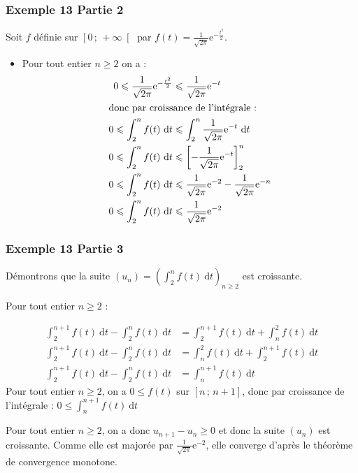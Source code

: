 \documentclass[11pt, hyperref={urlcolor=red,%
            linkcolor=blue, %
            colorlinks=true}]{beamer}
\newcommand{\Interfo}[2]{\left[#1\, ;\, #2\right[}
\newcommand{\Interff}[2]{\left[#1\, ;\, #2\right]}
\newcommand{\suite}[1]{\ensuremath{\left(#1_{n}\right)}}
\newcommand{\Suite}[2]{\ensuremath{\left(#1\right)_{#2}}}
\newcommand{\dt}{\ensuremath{\text{d}t}}		%
\newcommand{\integralet}[3]{\int_{#1}^{#2} #3 \ \dt}
\begin{document}
\begin{frame}
\frametitle{Exemple  13 Partie 2}

Soit $f$ définie sur $\Interfo{0}{+\infty}$ par $f(t)=\frac{1}{\sqrt{2\pi}}\text{e}^{-\frac{t^2}{2}}$.

\pause \begin{itemize}
\item  Pour tout entier $n \geqslant 2$ on a : 
\pause \begin{align*}
0 \leqslant  \frac{1}{\sqrt{2\pi}}\text{e}^{-\frac{t^2}{2}}   &\leqslant  \frac{1}{\sqrt{2\pi}}\text{e}^{-t} \\
\intertext{donc par croissance de l'intégrale :}
0 \leqslant \integralet{2}{n}{f(t)} & \leqslant \integralet{2}{n}{\frac{1}{\sqrt{2\pi}}\text{e}^{-t} } \\
0 \leqslant \integralet{2}{n}{f(t)} & \leqslant \left[-\frac{1}{\sqrt{2\pi}}\text{e}^{-t}  \right]_{2}^{n} \\ 
0 \leqslant \integralet{2}{n}{f(t)} & \leqslant \frac{1}{\sqrt{2\pi}}\text{e}^{-2}-  \frac{1}{\sqrt{2\pi}}\text{e}^{-n} \\
0 \leqslant \integralet{2}{n}{f(t)} & \leqslant \frac{1}{\sqrt{2\pi}}\text{e}^{-2}
\end{align*}
\end{itemize}
\end{frame}



\begin{frame}
\frametitle{Exemple  13 Partie 3}

Démontrons que la suite $\suite{u}=\Suite{\integralet{2}{n}{f(t)}}{n \geqslant 2}$ est croissante.

Pour tout entier $n \geqslant 2$ : 

\pause \begin{align*}
\integralet{2}{n+1}{f(t)}  - \integralet{2}{n}{f(t)}  &= \integralet{2}{n+1}{f(t)}  + \integralet{n}{2}{f(t)} \\
\integralet{2}{n+1}{f(t)}  - \integralet{2}{n}{f(t)}  &= \integralet{n}{2}{f(t)} +\integralet{2}{n+1}{f(t)}  \\
\integralet{2}{n+1}{f(t)} -\integralet{2}{n}{f(t)}  &= \integralet{n}{n+1}{f(t)}
\end{align*}
Pour tout entier $n \geqslant 2$, on a $0 \leqslant f(t)$ sur $\Interff{n}{n+1}$, donc par croissance de l'intégrale :
$
0 \leqslant \integralet{n}{n+1}{f(t)}
$

Pour tout entier $n \geqslant 2$, on a donc $u_{n+1}-u_{n} \geqslant 0$ et donc la suite $\suite{u}$ est croissante. Comme elle est majorée par $\frac{1}{\sqrt{2\pi}}\text{e}^{-2}$, elle converge d'après le théorème de convergence monotone.
\end{frame}
%
\end{document}
